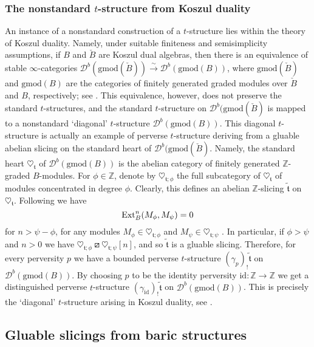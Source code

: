 \documentclass{article}
\theoremstyle{definition}
\newcommand{\Z}{\mathbb{Z}}
\newcommand{\tee}{\mathfrak{t}}
\newcommand{\orth}{\boxslash}
\begin{document}
\subsubsection{The nonstandard $t$-structure from Koszul duality}

 An instance of a nonstandard construction of a $t$-structure lies within the theory of Koszul duality. Namely, under suitable finiteness and semisimplicity assumptions, if $B$ and $\check{B}$ are Koszul dual algebras, then there is an equivalence of stable $\infty$-categories $\mathscr{D}^b(\mathrm{gmod}(\check{B}))\xrightarrow{\sim}\mathscr{D}^b(\mathrm{gmod}({B}))$, where $\mathrm{gmod}(\check{B})$ and $\mathrm{gmod}({B})$ are the categories of finitely generated graded modules over $\check{B}$ and $B$, respectively; see \cite{beilinson-ginzburg-soergel}. This equivalence, however, does not preserve the standard $t$-structures, and the standard $t$-structure on $\mathscr{D}^b(\mathrm{gmod}(\check{B})$ is mapped to a nonstandard `diagonal' $t$-structure $\mathscr{D}^b(\mathrm{gmod}({B}))$. This diagonal $t$-structure is actually an example of perverse $t$-structure deriving from a gluable abelian slicing on the standard heart of $\mathscr{D}^b(\mathrm{gmod}(\check{B})$. Namely, the standard heart $\heartsuit_\tee$ of $\mathscr{D}^b(\mathrm{gmod}({B}))$ is the abelian category of finitely generated $\Z$-graded $B$-modules. For $\phi \in \Z$, denote by $\heartsuit_{\tee;\phi}$ the full subcategory of $\heartsuit_{\tee}$ of modules concentrated in degree $\phi$. Clearly, this defines an abelian $\Z$-slicing $\tilde{\tee}$ on $\heartsuit_{\tee}$. Following \cite{kos} we have
  \[
  \textnormal{Ext}_{B}^n(M_{\phi},M_{\psi})=0
  \]
for $n>\psi - \phi$, for any modules $M_\phi\in\heartsuit_{\tee;\phi}$ and $M_\psi\in\heartsuit_{\tee;\psi}$ . In particular, if $\phi>\psi$ and $n>0$ we have  $\heartsuit_{\tee;\phi}\orth \heartsuit_{\tee;\psi}[n]$, and so
$\tilde{\tee}$ is a gluable slicing. Therefore, for every perversity $p$  we have a bounded perverse $t$-structure $(\gamma_p)_!\tilde{\tee}$ on $\mathscr{D}^b(\mathrm{gmod}({B}))$. By choosing $p$ to be the identity perversity $\mathrm{id}\colon \Z\to \Z$ we get a distinguished perverse $t$-structure $(\gamma_{\mathrm{id}})_!\tilde{\tee}$ on $\mathscr{D}^b(\mathrm{gmod}({B}))$. This is precisely the `diagonal' $t$-structure arising in Koszul duality, see \cite{??}. 




\subsection{Gluable slicings from baric structures}\label{baric}
\end{document}
